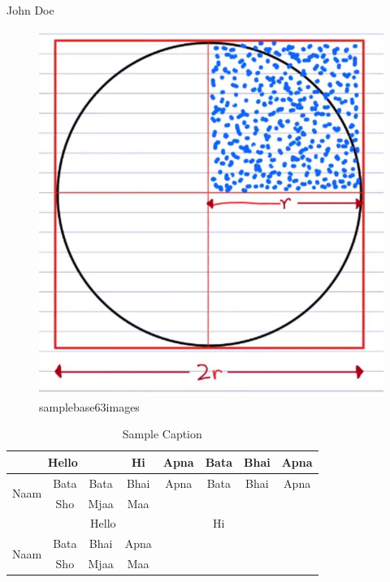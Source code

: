 \documentclass[journal,lettersize]{IEEEtran}%
\begin{document}
\begin{IEEEbiographynophoto}{John Doe}
    \begin{figure}[!t] 
    \centerline{\includegraphics[width=\linewidth]{image_5.jpeg}}
    \caption{samplebase63images}
    \label{fig:image_5.jpeg}
    \end{figure}
\cite{66a7cc08894ec6cbd7e06be0}
\begin{table}[htbp]
\caption{Sample Caption}
\begin{center}
\begin{tabular}{|c||c||c||c||c||c||c||c|}
\hline
\multicolumn{3}{|c|}{Hello} &Hi &Apna &Bata &Bhai &Apna  \\
\hline
\multirow{2}{*}{Naam} &Bata &Bata &Bhai &Apna &Bata &Bhai &Apna  \\
\hhline{~-------}
 &Sho &Mjaa &Maa & & & &  \\
\hline
\multicolumn{5}{|c|}{Hello} &Hi & &  \\
\hline
\multirow{2}{*}{Naam} &Bata &Bhai &Apna & & & &  \\
\hhline{~-------}
 &Sho &Mjaa &Maa & & & &  \\
\hline

\end{tabular}
\label{table}
\end{center}
\end{table}


\end{IEEEbiographynophoto}
\end{document}

